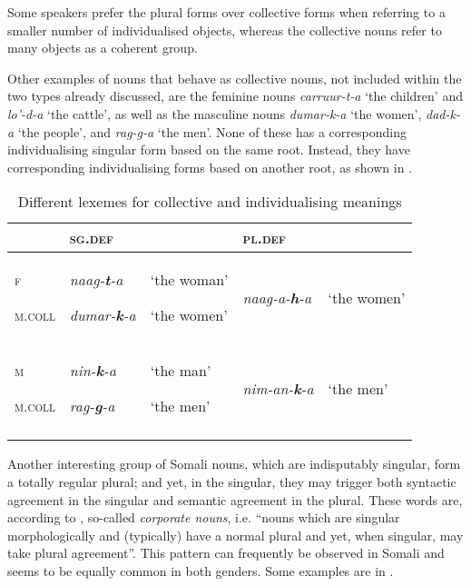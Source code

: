 \documentclass[output=paper]{langsci/langscibook}
\begin{document}
Some speakers prefer the plural forms over collective forms when referring to a smaller number of individualised objects, whereas the collective nouns refer to many objects as a coherent group. 

Other examples of nouns that behave as collective nouns, not included within the two types already discussed, are the feminine nouns \textit{carruur-t-a} ‘the children’ and \textit{lo’-d-a} ‘the cattle’, as well as the masculine nouns \textit{dumar-k-a} ‘the women’, \textit{dad-k-a} ‘the people’, and \textit{rag-g-a} ‘the men’. None of these has a corresponding individualising singular form based on the same root. Instead, they have corresponding individualising forms based on another root, as shown in .


\begin{table}
\caption{Different lexemes for collective and individualising meanings}
\label{tab:nilsson:13}
\begin{tabularx}{\textwidth}{XXXXX} 
\lsptoprule
& {\textsc{sg.def}} &  & {\textsc{pl.def}} & \\
\midrule
{\textsc{f}}

{\textsc{m.coll}} & {\textit{naag-}\textbf{\textit{t}}\textit{-a}}

{\textit{dumar-}\textbf{\textit{k}}\textit{-a}} & {‘the woman’}

{‘the women’} & {\textit{naag-a-}\textbf{\textit{h}}\textit{-a}} & {‘the women’}\\
{\textsc{m}}

{\textsc{m.coll}} & {\textit{nin-}\textbf{\textit{k}}\textit{-a}}

{\textit{rag-}\textbf{\textit{g}}\textit{-a}} & {‘the man’}

{‘the men’} & {\textit{nim-an-}\textbf{\textit{k}}\textit{-a}} & {‘the men’}\\
\lspbottomrule
\end{tabularx}

\end{table} 



Another interesting group of Somali nouns, which are indisputably singular, form a totally regular plural; and yet, in the singular, they may trigger both syntactic agreement in the singular and semantic agreement in the plural. These words are, according to \citet[188]{Corbett2000}, so-called \textit{corporate nouns}, i.e. “nouns which are singular morphologically and (typically) have a normal plural and yet, when singular, may take plural agreement”. This pattern can frequently be observed in Somali and seems to be equally common in both genders. Some examples are in .
 
\end{document}

